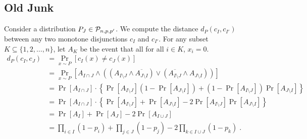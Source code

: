 \subsection{Old Junk}

Consider a distribution $P_J \in \P_{n,p,p'}$. We compute the distance $d_P(c_I, c_{I'})$ between
any two monotone disjunctions $c_I$ and $c_{I'}$. For any subset $K \subseteq \{1,2,\dots,n\}$, let
$A_K$ be the event that all for all $i \in K$, $x_i = 0$.
\begin{align*}
d_P(c_I, c_J)
& = \Pr_{x \sim P}[c_I(x) \neq c_J(x)] \\
& = \Pr_{x \sim P}[A_{I \cap J} \wedge ((A_{I \setminus J} \wedge \overline{A_{J \setminus I}}) \vee (\overline{A_{I \setminus J}} \wedge A_{J \setminus I} )) ] \\
& = \Pr[A_{I \cap J}] \cdot \left\{ \Pr[A_{I \setminus J}] (1 - \Pr[A_{J \setminus I}]) + (1 - \Pr[A_{I \setminus J}]) \Pr[A_{J \setminus I}] \right\} \\
& = \Pr[A_{I \cap J}] \cdot \left\{ \Pr[A_{I \setminus J}] + \Pr[A_{J \setminus I}] - 2 \Pr[A_{I \setminus J}] \Pr[A_{J \setminus I}] \right\} \\
& = \Pr[A_I] + \Pr[A_J] - 2 \Pr[A_{I \cup J}] \\
& = \prod_{i \in I} (1 - p_i) + \prod_{j \in J} (1 - p_j) - 2 \prod_{k \in I \cup J} (1 - p_k) \; . \\
\end{align*}
